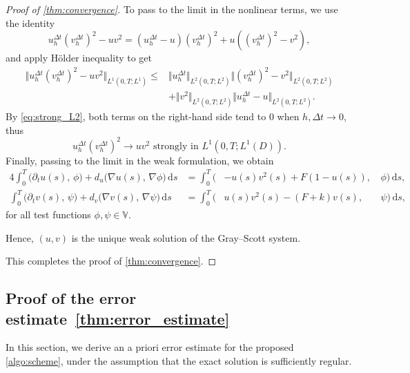 \documentclass[11pt, a4paper]{amsart}
\newcommand{\dd}{\,\mathrm{d}}
\newcommand{\VV}{\mathbb{V}}
\numberwithin{equation}{section}
\begin{document}
\begin{proof}[Proof of \cref{thm:convergence}]
		To pass to the limit in the nonlinear terms, we use the identity
		\[
		u_h^{\Delta t} (v_h^{\Delta t})^2 - u v^2 = (u_h^{\Delta t} - u)(v_h^{\Delta t})^2 + u ((v_h^{\Delta t})^2 - v^2), 
		\]
		and apply H\"older inequality to get
		\begin{align*}
			\big\Vert u_h^{\Delta t} (v_h^{\Delta t})^2 - u v^2\big\Vert _{L^1(0,T;L^1)} \leq{} &\big\Vert u_h^{\Delta t}\big\Vert _{L^2(0,T;L^2)} \big\Vert (v_h^{\Delta t})^2 - v^2\big\Vert _{L^2(0,T;L^2)} 
			\\
			&+ \big\Vert v^2\Vert _{L^2(0,T;L^2)} \big\Vert u_h^{\Delta t} - u\big\Vert _{L^2(0,T;L^2)}.
		\end{align*}
		By \eqref{eq:strong_L2}, both terms on the right-hand side tend to 0 when $h,\Delta t\to 0$, thus 
		\[
		u_h^{\Delta t}(v_h^{\Delta t})^2 \to uv^2 \mbox{ strongly in } L^1(0,T;L^1(D)).
		\]
		Finally, passing to the limit in the weak formulation, we obtain
		\begin{alignat*}{4}
				\int_0^T \big(\partial_t u(s),\, \phi\big) + d_u \big(  \nabla u(s),  \, \nabla \phi\big) \dd s&= \int_0^T \big(&-u(s)v^2(s) + F(1 - u(s)), \,&\phi\big)\dd s, 
				\\
				\int_0^T \big(\partial_t v(s), \,\psi\big) + d_v \big(  \nabla v(s),\,   \nabla \psi\big)\dd s &= \int_0^T \big(&u(s)v^2(s) - (F + k)v(s), \,&\psi\big)\dd s,
		\end{alignat*}
		for all test functions $\phi, \psi\in\VV$.
		
		Hence, $(u,v)$ is the unique weak solution of the Gray--Scott system.
		
		This completes the proof of \cref{thm:convergence}.
	\end{proof}
	
	
	\subsection{\texorpdfstring{Proof of the error estimate~\cref{thm:error_estimate}}{Proof of the error estimate}}\label{subsec:error_estimate}
	
	In this section, we derive an a priori error estimate for the proposed \cref{algo:scheme}, under the assumption that the exact solution is sufficiently regular.
	
\end{document}
